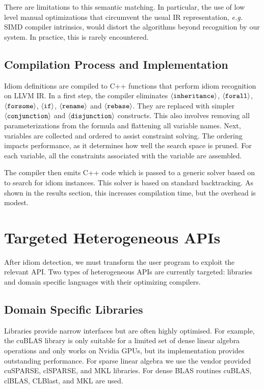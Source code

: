     There are limitations to this semantic matching.
    In particular, the use of low level manual optimizations that circumvent the
    usual IR representation, {\em e.g.}  SIMD compiler intrinsics, would distort
    the algorithms beyond recognition by our system.
    In practice, this is rarely encountered.



\subsection{Compilation Process and Implementation}
\label{sec:compilation}

    Idiom definitions are compiled to C++ functions that perform idiom
    recognition on LLVM IR.
    In a first step, the compiler eliminates
    $\left<\text{\tt inheritance}\right>$, $\left<\text{\tt forall}\right>$,
    $\left<\text{\tt forsome}\right>$, $\left<\text{\tt if}\right>$,
    $\left<\text{\tt rename}\right>$ and $\left<\text{\tt rebase}\right>$.
    They are replaced with simpler $\left<\text{\tt conjunction}\right>$ and
    $\left<\text{\tt disjunction}\right>$ constructs.
    This also involves removing all parameterizations from the formula and
    flattening all variable names.
    Next, variables are collected and ordered to assist constraint solving.
    The ordering impacts performance, as it determines how well the search space
    is pruned. 
    For each variable, all the constraints associated with the variable are
    assembled.

    The compiler then emits C++ code which is passed to a generic solver based on \cite{ginsbach2017discovery} to search for idiom instances.
    This solver is based on standard backtracking.
    As shown in the results section, this increases compilation time, but the overhead is modest.

\section{Targeted Heterogeneous APIs}

    After idiom detection, we must transform the user program to exploit the
    relevant API.
    Two types of heterogeneous APIs are currently targeted: libraries and domain
    specific languages with their optimizing compilers.

    \subsection{Domain Specific Libraries}
    Libraries provide narrow interfaces but are often highly optimised.
    For example, the cuBLAS library is only suitable for a limited set of dense
    linear algebra operations and only works on Nvidia GPUs, but its
    implementation provides outstanding performance.
    For sparse linear algebra we use the vendor provided cuSPARSE, clSPARSE, and
    MKL libraries.
    For dense BLAS routines cuBLAS, clBLAS, CLBlast, and MKL are used.


